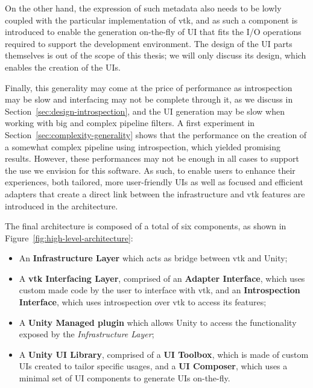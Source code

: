 On the other hand, the expression of such metadata also needs to be lowly coupled with the particular implementation of \acrshort{vtk}, and as such a component is introduced to enable the generation on-the-fly of UI that fits the I/O operations required to support the development environment. The design of the UI parts themselves is out of the scope of this thesis; we will only discuss its design, which enables the creation of the UIs.

Finally, this generality may come at the price of performance as introspection may be slow and interfacing may not be complete through it, as we discuss in Section~\ref{sec:design-introspection}, and the UI generation may be slow when working with big and complex pipeline filters. A first experiment in Section~\ref{sec:complexity-generality} shows that the performance on the creation of a somewhat complex pipeline using introspection, which yielded promising results. However, these performances may not be enough in all cases to support the use we envision for this software. As such, to enable users to enhance their experiences, both  tailored, more user-friendly UIs as well as focused and efficient adapters that create a direct link between the infrastructure and \acrshort{vtk} features are introduced in the architecture.

The final architecture is composed of a total of six components, as shown in Figure~\ref{fig:high-level-architecture}:

\begin{itemize}
    \item An \textbf{Infrastructure Layer} which acts as bridge between \acrshort{vtk} and Unity;
    \item A \textbf{\acrshort{vtk} Interfacing Layer}, comprised of an \textbf{Adapter Interface}, which uses custom made code by the user to interface with \acrshort{vtk}, and an \textbf{Introspection Interface}, which uses introspection over \acrshort{vtk} to access its features;
    \item A \textbf{Unity Managed plugin} which allows Unity to access the functionality exposed by the \textit{Infrastructure Layer};
    \item A \textbf{Unity UI Library}, comprised of a \textbf{UI Toolbox}, which is made of custom UIs created to tailor specific usages, and a \textbf{UI Composer}, which uses a minimal set of UI components to generate UIs on-the-fly.
\end{itemize}

